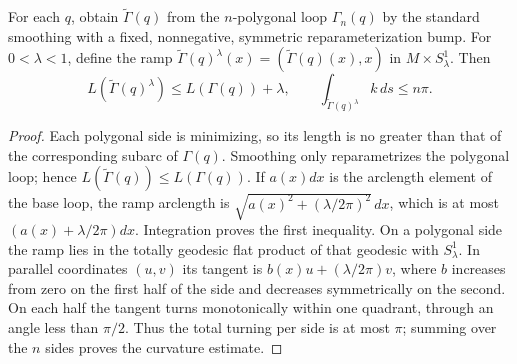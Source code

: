 \begin{theorem}
\label{lem:smoothed-polygonal-ramp-bounds}
\notready
For each $q$, obtain $\widetilde\Gamma(q)$ from the $n$-polygonal loop
$\Gamma_n(q)$ by the standard smoothing with a fixed, nonnegative, symmetric
reparameterization bump.  For
$0<\lambda<1$, define the ramp
$\widetilde\Gamma(q)^\lambda(x)=(\widetilde\Gamma(q)(x),x)$ in
 $M\times S^1_\lambda$.  Then
\[
 L(\widetilde\Gamma(q)^\lambda)
 \le L(\Gamma(q))+\lambda,
 \qquad
 \int_{\widetilde\Gamma(q)^\lambda}k\,ds\le n\pi .
\]
\end{theorem}
\begin{proof}
Each polygonal side is minimizing, so its length is no greater than that of
the corresponding subarc of $\Gamma(q)$.  Smoothing only reparametrizes the
polygonal loop; hence $L(\widetilde\Gamma(q))\le L(\Gamma(q))$.  If
$a(x)dx$ is the arclength element of the base loop, the ramp arclength is
$\sqrt{a(x)^2+(\lambda/2\pi)^2}\,dx$, which is at most
$(a(x)+\lambda/2\pi)dx$.  Integration proves the first inequality.  On a
polygonal side the ramp lies in the totally geodesic flat product of that
geodesic with $S^1_\lambda$.  In parallel coordinates $(u,v)$ its tangent is
$b(x)u+(\lambda/2\pi)v$, where $b$ increases from zero on the first half of
the side and decreases symmetrically on the second.  On each half the tangent
turns monotonically within one quadrant, through an angle less than
$\pi/2$.  Thus the total turning per side is at most $\pi$; summing over the
$n$ sides proves the curvature estimate.
\end{proof}

